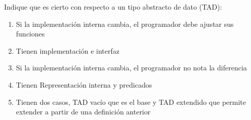 {
Indique que es cierto con respecto a un tipo abstracto de dato (TAD):
	\begin{enumerate}
		\item Si la implementación interna cambia, el programador debe ajustar sus funciones
		\item Tienen implementación e interfaz %
		\item Si la implementación interna cambia, el programador no nota la diferencia %
		\item Tienen Representación interna y predicados
		\item Tienen dos casos, TAD vacío que es el base y TAD extendido que permite extender a partir de una definición anterior
	\end{enumerate}

}
